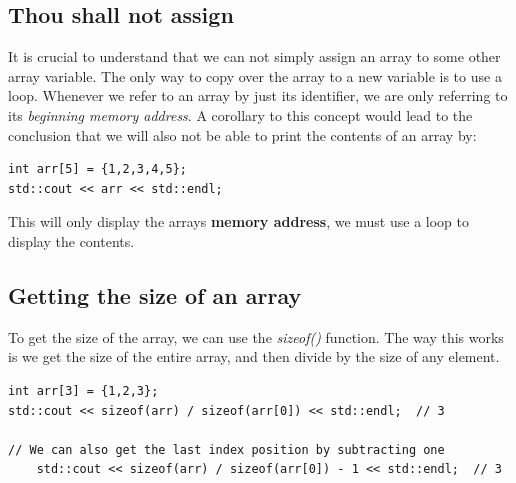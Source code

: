 \documentclass{report}
\begin{document}
   \subsection{Thou shall not assign}
   \bigbreak \noindent 
   It is crucial to understand  that we can not simply assign an array to some other array variable. The only way to copy over the array to a new variable is to use a loop. Whenever we refer to an array by just its identifier, we are only referring to its \textit{beginning memory address}.
   \bigbreak \noindent 
   A corollary to this concept would lead to the conclusion that we will also not be able to print the contents of an array by:
   \bigbreak \noindent 
   \sepline
   \begin{verbatim}
int arr[5] = {1,2,3,4,5};
std::cout << arr << std::endl;

   \end{verbatim}
   \sepline
   \bigbreak \noindent 
   This will only display the arrays \textbf{memory address}, we must use a loop to display the contents.

   \pagebreak \bigbreak \noindent 
   \subsection{Getting the size of an array}
   \bigbreak \noindent 
   To get the size of the array, we can use the \textit{sizeof()} function. The way this works is we get the size of the entire array, and then divide by the size of any element.
   \bigbreak \noindent 
    \sepline
    \begin{verbatim}
int arr[3] = {1,2,3};
std::cout << sizeof(arr) / sizeof(arr[0]) << std::endl;  // 3

// We can also get the last index position by subtracting one
    std::cout << sizeof(arr) / sizeof(arr[0]) - 1 << std::endl;  // 3
    \end{verbatim}
    \sepline
    \bigbreak \noindent 

    \bigbreak \noindent 
\end{document}
